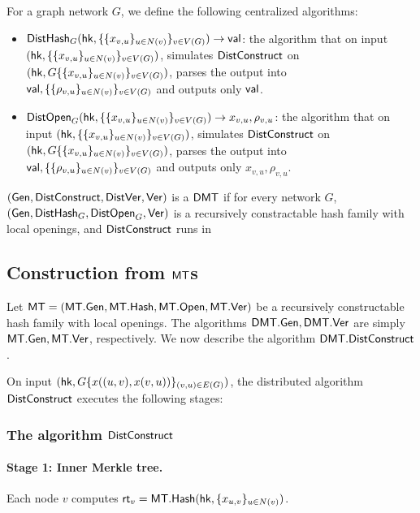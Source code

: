 \begin{definition}
    For a graph network $G$, we define the following centralized algorithms:
    \begin{itemize}
        \item $\mathsf{DistHash}_G(\mathsf{hk}, \{\{x_{v,u}\}_{u\in N(v)}\}_{v\in V(G)}) \rightarrow \mathsf{val}$: the algorithm that on input $(\mathsf{hk}, \\ \{\{x_{v,u}\}_{u\in N(v)}\}_{v\in V(G)})$, simulates $\mathsf{DistConstruct}$ on $(\mathsf{hk}, G \{\{x_{v,u}\}_{u\in N(v)}\}_{v\in V(G)})$, parses the output into $\mathsf{val}, \{\{\rho_{v,u}\}_{u\in N(v)}\}_{v\in V(G)}$ and outputs only $\mathsf{val}$.
        \item $\mathsf{DistOpen}_G(\mathsf{hk}, \{\{x_{v,u}\}_{u\in N(v)}\}_{v\in V(G)}) \rightarrow x_{v,u}, \rho_{v,u}$: the algorithm that on input $(\mathsf{hk}, \\  \{\{x_{v,u}\}_{u\in N(v)}\}_{v\in V(G)})$, simulates $\mathsf{DistConstruct}$ on $(\mathsf{hk}, G \{\{x_{v,u}\}_{u\in N(v)}\}_{v\in V(G)})$, parses the output into $\mathsf{val}, \{\{\rho_{v,u}\}_{u\in N(v)}\}_{v\in V(G)}$ and outputs only $x_{v,u}, \rho_{v,u}$.
    \end{itemize}
    $(\mathsf{Gen}, \mathsf{DistConstruct}, \mathsf{DistVer}, \mathsf{Ver})$ is a $\mathsf{DMT}$ if for every network $G$, $(\mathsf{Gen}, \mathsf{DistHash}_G, \mathsf{DistOpen}_G, \mathsf{Ver})$ is a recursively constractable hash family with local openings, and $\mathsf{DistConstruct}$ runs in 
\end{definition}

\subsection{Construction from $\mathsf{MT}$s}

Let $\mathsf{MT} = (\mathsf{MT}.\mathsf{Gen}, \mathsf{MT}.\mathsf{Hash}, \mathsf{MT}.\mathsf{Open}, \mathsf{MT}.\mathsf{Ver})$ be a recursively constructable hash family with local openings. The algorithms $\mathsf{DMT}.\mathsf{Gen}, \mathsf{DMT}.\mathsf{Ver}$ are simply $\mathsf{MT}.\mathsf{Gen}, \mathsf{MT}.\mathsf{Ver}$, respectively. We now describe the algorithm $\mathsf{DMT}.\mathsf{DistConstruct}$.

On input $(\mathsf{hk}, G \{x((u,v), x(v,u))\}_{(v,u)\in E(G)})$, the distributed algorithm $\mathsf{DistConstruct}$ executes the following stages:


\subsubsection{The algorithm $\mathsf{DistConstruct}$}

\paragraph{Stage 1: Inner Merkle tree. } Each node $v$ computes $\mathsf{rt}_v = \mathsf{MT}.\mathsf{Hash}(\mathsf{hk}, \{x_{u,v}\}_{u\in N(v)})$.

